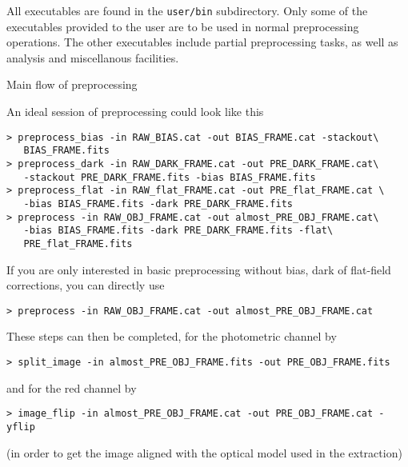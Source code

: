 %
%
\label{S:Executables}

All executables are found in the {\tt user/bin} subdirectory.
Only some of the executables provided to the user are to be used in normal
preprocessing operations. The other executables include partial
preprocessing tasks, as well as analysis and miscellanous facilities.

\begin{subsection}{Main flow of preprocessing}

An ideal session of preprocessing could look like this
\begin{verbatim}
> preprocess_bias -in RAW_BIAS.cat -out BIAS_FRAME.cat -stackout\
   BIAS_FRAME.fits 
> preprocess_dark -in RAW_DARK_FRAME.cat -out PRE_DARK_FRAME.cat\
   -stackout PRE_DARK_FRAME.fits -bias BIAS_FRAME.fits
> preprocess_flat -in RAW_flat_FRAME.cat -out PRE_flat_FRAME.cat \
   -bias BIAS_FRAME.fits -dark PRE_DARK_FRAME.fits
> preprocess -in RAW_OBJ_FRAME.cat -out almost_PRE_OBJ_FRAME.cat\
   -bias BIAS_FRAME.fits -dark PRE_DARK_FRAME.fits -flat\
   PRE_flat_FRAME.fits
\end{verbatim}
If you are only interested in basic preprocessing without bias, dark
of flat-field corrections, you can directly use
\begin{verbatim}
> preprocess -in RAW_OBJ_FRAME.cat -out almost_PRE_OBJ_FRAME.cat
\end{verbatim}
These steps can then be completed,
for the photometric channel by
\begin{verbatim}
> split_image -in almost_PRE_OBJ_FRAME.fits -out PRE_OBJ_FRAME.fits
\end{verbatim}   
and for the red channel by 
\begin{verbatim}
> image_flip -in almost_PRE_OBJ_FRAME.cat -out PRE_OBJ_FRAME.cat -yflip
\end{verbatim}
(in order to get the image aligned with
the optical model used in the extraction)


\end{subsection}
